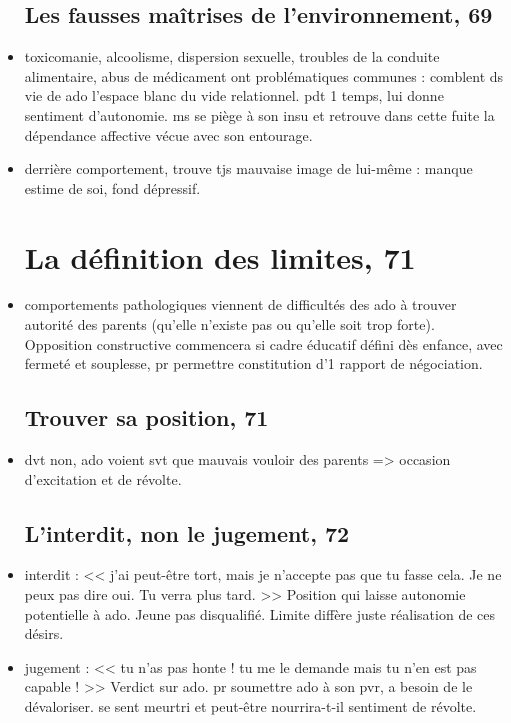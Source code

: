 \documentclass[12pt]{report}
\begin{document}
\begin{itemize}
\subsection{Les fausses maîtrises de l'environnement, 69}

\item toxicomanie, alcoolisme, dispersion sexuelle, troubles de la conduite alimentaire, abus de médicament ont problématiques communes :  comblent ds vie de ado l'espace blanc du vide relationnel. pdt 1 temps, lui donne sentiment d'autonomie. ms se piège à son insu et retrouve dans cette fuite la dépendance affective vécue avec son entourage.\\

\item derrière comportement, trouve tjs mauvaise image de lui-même : manque estime de soi, fond dépressif.

\section{La définition des limites, 71}

\item comportements pathologiques viennent de difficultés des ado à trouver autorité des parents (qu'elle n'existe pas ou qu'elle soit trop forte). Opposition constructive commencera si cadre éducatif défini dès enfance, avec fermeté et souplesse, pr permettre constitution d'1 rapport de négociation.

\subsection{Trouver sa position, 71}

\item dvt non, ado voient svt que mauvais vouloir des parents => occasion d'excitation et de révolte.

\subsection{L'interdit, non le jugement, 72}

\item interdit : << j'ai peut-être tort, mais je n'accepte pas que tu fasse cela. Je ne peux pas dire oui. Tu verra plus tard. >> Position qui laisse autonomie potentielle à ado. Jeune pas disqualifié. Limite diffère juste réalisation de ces désirs.\\

\item jugement : << tu n'as pas honte ! tu me le demande mais tu n'en est pas capable ! >> Verdict sur ado.  pr soumettre ado à son pvr, a besoin de le dévaloriser. se sent meurtri et peut-être nourrira-t-il sentiment de révolte.\\


\end{itemize}
\end{document}
